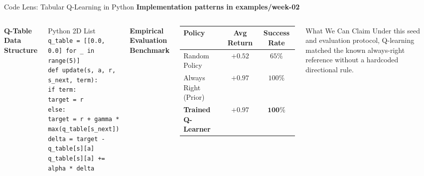 \documentclass[aspectratio=169,10pt]{beamer}
\newcommand{\sectionlabel}[1]{%
  {\small\bfseries\color{islteal}#1}\par\vspace{0.14cm}%
}
\begin{document}
\begin{frame}{Code Lens: Tabular Q-Learning in Python}
  \sectionlabel{Implementation patterns in examples/week-02}

  \begin{columns}[T,onlytextwidth]
      {\small\bfseries\color{islteal} Q-Table Data Structure}\par\vspace{0.06cm}
      {\footnotesize
      \begin{block}{\footnotesize Python 2D List}
\texttt{q\_table = [[0.0, 0.0] for \_ in range(5)]}\\[3pt]
\texttt{def update(s, a, r, s\_next, term):}\\
\texttt{\quad if term:}\\
\texttt{\quad\quad target = r}\\
\texttt{\quad else:}\\
\texttt{\quad\quad target = r + gamma * max(q\_table[s\_next])}\\
\texttt{\quad delta = target - q\_table[s][a]}\\
\texttt{\quad q\_table[s][a] += alpha * delta}
      \end{block}}

      {\small\bfseries\color{islgreen} Empirical Evaluation Benchmark}\par\vspace{0.06cm}
      \renewcommand{\arraystretch}{1.15}
      \setlength{\tabcolsep}{4pt}
      {\centering
        \footnotesize
        \begin{tabular}{@{}lcc@{}}
          \toprule
          \textbf{Policy} & \textbf{Avg Return} & \textbf{Success Rate} \\
          \midrule
          Random Policy & $+0.52$ & $65\%$ \\
          Always Right (Prior) & $+0.97$ & $100\%$ \\
          \textbf{Trained Q-Learner} & $\mathbf{+0.97}$ & $\mathbf{100\%}$ \\
          \bottomrule
        \end{tabular}
      \par}
      \vspace{0.14cm}
      \begin{alertblock}{\footnotesize What We Can Claim}
        Under this seed and evaluation protocol, Q-learning matched the known
        always-right reference without a hardcoded directional rule.
      \end{alertblock}
  \end{columns}
\end{frame}
\end{document}
